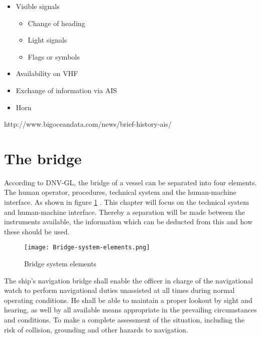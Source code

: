 \begin{itemize}
	\item Visible signals
	\begin{itemize}
		\item Change of heading
		\item Light signals
		\item Flags or symbols
	\end{itemize}
	\item Availability on \ac{VHF}
	\item Exchange of information via \ac{AIS}
	\item Horn
\end{itemize}

http://www.bigoceandata.com/news/brief-history-ais/

\section{The bridge}
According to DNV-GL, the bridge of a vessel can be separated into four elements. The human operator, procedures,
technical system and the human-machine interface. As shown in figure \ref{fig:Bridge-system-elements} \cite{DNVGL2011}. This chapter will focus on the technical system and human-machine interface. Thereby a separation will be made between the instruments available, the information which can be deducted from this and how these should be used. 

\begin{figure}[H]
	\centering
	\texttt{[image: Bridge-system-elements.png]}
	\caption{Bridge system elements}
	\label{fig:Bridge-system-elements}
\end{figure}

The ship’s navigation bridge shall enable the officer in charge of the navigational watch to perform navigational duties unassisted at all times during normal operating conditions. He shall be able to maintain a proper lookout by sight and hearing, as well by all available means appropriate in the prevailing circumstances and conditions. To make a complete assessment of the situation, including the risk of collision, grounding and other hazards to navigation.

